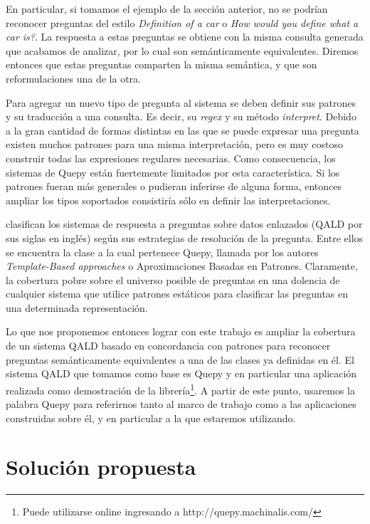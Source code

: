 En particular, si tomamos el ejemplo de la sección anterior, no se podrían reconocer preguntas del estilo \textit{Definition of a car} o \textit{How would you define what a car is?}. La respuesta a estas preguntas se obtiene con la misma consulta generada que acabamos de analizar, por lo cual son semánticamente equivalentes. Diremos entonces que estas preguntas comparten la misma semántica, y que son reformulaciones una de la otra.

Para agregar un nuevo tipo de pregunta al sistema se deben definir sus patrones y su traducción a una consulta. Es decir, su \textit{regex} y su método \textit{interpret}. Debido a la gran cantidad de formas distintas en las que se puede expresar una pregunta existen muchos patrones para una misma interpretación, pero es muy costoso construir todas las expresiones regulares necesarias. Como consecuencia, los sistemas de Quepy están fuertemente limitados por esta característica. Si los patrones fueran más generales o pudieran inferirse de alguna forma, entonces ampliar los tipos soportados consistiría sólo en definir las interpretaciones.

\citet{ungerQALD} clasifican los sistemas de respuesta a preguntas sobre datos enlazados (QALD por sus siglas en inglés) según sus estrategias de resolución de la pregunta. Entre ellos se encuentra la clase a la cual pertenece Quepy, llamada por los autores \textit{Template-Based approaches} o Aproximaciones Basadas en Patrones. Claramente, la cobertura pobre sobre el universo posible de preguntas en una dolencia de cualquier sistema que utilice patrones estáticos para clasificar las preguntas en una determinada representación.

Lo que nos proponemos entonces lograr con este trabajo es ampliar la cobertura de un sistema QALD basado en concordancia con patrones para reconocer preguntas semánticamente equivalentes a una de las clases ya definidas en él. El sistema QALD que tomamos como base es Quepy y en particular una aplicación realizada como demostración de la librería\footnote{Puede utilizarse online ingresando a http://quepy.machinalis.com/}. A partir de este punto, usaremos la palabra Quepy para referirnos tanto al marco de trabajo como a las aplicaciones construidas sobre él, y en particular a la que estaremos utilizando.

\section{Solución propuesta}

